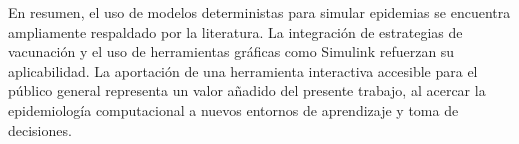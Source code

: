 En resumen, el uso de modelos deterministas para simular epidemias se encuentra ampliamente respaldado por la literatura. La integración de estrategias de vacunación y el uso de herramientas gráficas como Simulink refuerzan su aplicabilidad. La aportación de una herramienta interactiva accesible para el público general representa un valor añadido del presente trabajo, al acercar la epidemiología computacional a nuevos entornos de aprendizaje y toma de decisiones.






















